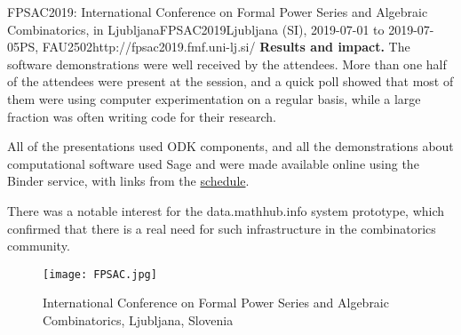 \begin{event}{FPSAC2019: International Conference on Formal Power Series and Algebraic Combinatorics, in Ljubljana}{FPSAC2019}{Ljubljana (SI),
  2019-07-01 to
  2019-07-05}{PS, FAU}{250}{2}{http://fpsac2019.fmf.uni-lj.si/}
\textbf{Results and impact.} The software demonstrations were well
received by the attendees. More than one half of the attendees were
present at the session, and a quick poll showed that most of them were
using computer experimentation on a regular basis, while a large
fraction was often writing code for their research.

All of the presentations used ODK components, and all the
demonstrations about computational software used Sage and were made
available online using the Binder service, with links from the
\href{http://fpsac2019.fmf.uni-lj.si/schedule/}{schedule}.

There was a notable interest for the \textsf{data.math\-hub.info}
system prototype, which confirmed that there is a real need for such
infrastructure in the combinatorics community.

\begin{figure}[ht]
  \texttt{[image: FPSAC.jpg]}
  \caption*{International Conference on Formal Power Series and Algebraic Combinatorics, Ljubljana, Slovenia}
\end{figure}

\end{event}
